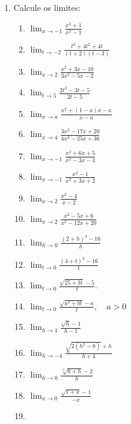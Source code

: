 \begin{enumerate}
\item Calcule os limites:
\begin{multicols}{2}
\begin{enumerate}
\item $\displaystyle\lim_{x\longrightarrow-1}
\displaystyle\frac{x^3 + 1}{ x^2 - 1}$ \item $
\displaystyle\lim_{t\longrightarrow-2} \displaystyle\frac{t^3 +
4t^2 + 4t}{ (t + 2)(t -3)}$ \item $
\displaystyle\lim_{x\longrightarrow2} \displaystyle\frac{x^2 + 3x
- 10}{ 3x^2 - 5x - 2}$ \item
$\displaystyle\lim_{t\longrightarrow5} \displaystyle\frac{2t^2 -
3t - 5} {2t - 5}$ \item $\displaystyle\lim_{x\longrightarrow a}
\displaystyle\frac{x^2 + (1 - a)x - a}{ x - a}$ \item $
\displaystyle\lim_{x\longrightarrow4} \displaystyle\frac{3x^2 -
17x + 20}{ 4x^2 - 25x + 36}$ \item $
\displaystyle\lim_{x\longrightarrow-1} \displaystyle\frac{x^2 + 6x
+ 5}{ x^2 - 3x - 4}$ \item $
\displaystyle\lim_{x\longrightarrow-1} \displaystyle\frac{x^2 -
1}{ x^2 + 3x + 2} $ \item $\displaystyle\lim_{x\longrightarrow2}
\displaystyle\frac{x^2 - 4}{ x - 2}$ \item $
\displaystyle\lim_{x\longrightarrow2} \displaystyle\frac{x^2 - 5x
+ 6}{ x^2 - 12x + 20}$ \item $\lim_{h\longrightarrow0}
\displaystyle\frac{(2 + h)^4 - 16}{ h}$ \item $
\displaystyle\lim_{t\longrightarrow0} \displaystyle\frac{(4 + t)^2
- 16}{ t}$ \item $\displaystyle\lim_{t\longrightarrow0}
\displaystyle\frac{\displaystyle\sqrt{25 + 3t} - 5}{ t}.$ \item
$\displaystyle\lim_{t\longrightarrow 0}\displaystyle\frac{
\displaystyle\sqrt{a^2 + bt} -a }{t},\quad a
> 0 $ \item $\displaystyle\lim_{h\longrightarrow 1}\displaystyle\frac{
\displaystyle\sqrt{h} - 1}{ h - 1}$ \item
$\displaystyle\lim_{h\longrightarrow-4} \displaystyle\frac{
\displaystyle\sqrt{ 2(h^2 - 8)} + h}{ h + 4} $ \item
$\displaystyle\lim_{h\longrightarrow0} \displaystyle\frac{
\displaystyle\sqrt[3]{ 8 + h}-2 }{h} $ \item
$\displaystyle\lim_{x\longrightarrow0}\displaystyle\frac{
\displaystyle\sqrt{1 + x}-1}{-x} $ \item

\end{enumerate}
\end{multicols}
\end{enumerate}
